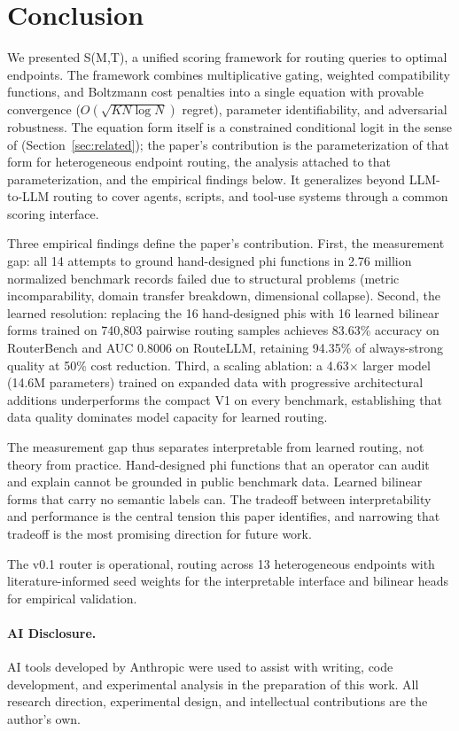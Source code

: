 \section{Conclusion}
\label{sec:conclusion}

We presented S(M,T), a unified scoring framework for routing queries to optimal endpoints. The framework combines multiplicative gating, weighted compatibility functions, and Boltzmann cost penalties into a single equation with provable convergence ($O(\sqrt{KN\log N})$ regret), parameter identifiability, and adversarial robustness. The equation form itself is a constrained conditional logit in the sense of \citet{mcfadden1974conditional} (Section~\ref{sec:related}); the paper's contribution is the parameterization of that form for heterogeneous endpoint routing, the analysis attached to that parameterization, and the empirical findings below. It generalizes beyond LLM-to-LLM routing to cover agents, scripts, and tool-use systems through a common scoring interface.

Three empirical findings define the paper's contribution. First, the measurement gap: all 14 attempts to ground hand-designed phi functions in 2.76 million normalized benchmark records failed due to structural problems (metric incomparability, domain transfer breakdown, dimensional collapse). Second, the learned resolution: replacing the 16 hand-designed phis with 16 learned bilinear forms trained on 740,803 pairwise routing samples achieves 83.63\% accuracy on RouterBench and AUC 0.8006 on RouteLLM, retaining 94.35\% of always-strong quality at 50\% cost reduction. Third, a scaling ablation: a 4.63$\times$ larger model (14.6M parameters) trained on expanded data with progressive architectural additions underperforms the compact V1 on every benchmark, establishing that data quality dominates model capacity for learned routing.

The measurement gap thus separates interpretable from learned routing, not theory from practice. Hand-designed phi functions that an operator can audit and explain cannot be grounded in public benchmark data. Learned bilinear forms that carry no semantic labels can. The tradeoff between interpretability and performance is the central tension this paper identifies, and narrowing that tradeoff is the most promising direction for future work.

The v0.1 router is operational, routing across 13 heterogeneous endpoints with literature-informed seed weights for the interpretable interface and bilinear heads for empirical validation.

\paragraph{AI Disclosure.} AI tools developed by Anthropic were used to assist with writing, code development, and experimental analysis in the preparation of this work. All research direction, experimental design, and intellectual contributions are the author's own.

